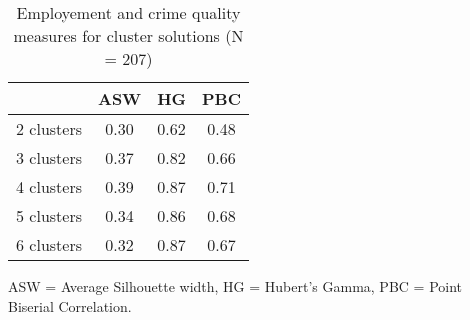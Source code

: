 \begin{table}[htp]
\footnotesize
\setlength{\tabcolsep}{35pt}
\renewcommand{\arraystretch}{1.3}
\begin{threeparttable}
\centering
\caption{Employement and crime quality measures for cluster solutions (N = 207)} 
\label{tab:quality_clusters_job_crime}
\begin{tabular}{lccc}
  \hline
 & ASW & HG & PBC \\ 
  \hline
2 clusters & 0.30 & 0.62 & 0.48 \\ 
  3 clusters & 0.37 & 0.82 & 0.66 \\ 
  4 clusters & 0.39 & 0.87 & 0.71 \\ 
  5 clusters & 0.34 & 0.86 & 0.68 \\ 
  6 clusters & 0.32 & 0.87 & 0.67 \\ 
   \hline
\end{tabular}
\begin{tablenotes}
\scriptsize
\item ASW = Average Silhouette width, HG = Hubert's Gamma, PBC = Point Biserial Correlation.
\end{tablenotes}
\end{threeparttable}
\end{table}
